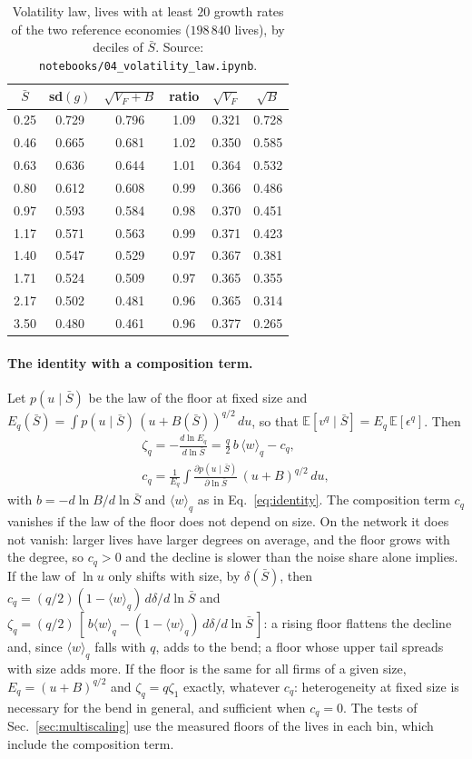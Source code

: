 \documentclass[pre,twocolumn,superscriptaddress,nofootinbib]{revtex4-2}
\newcommand{\E}{\mathbb E}
\newcommand{\Sb}{\bar S}
\begin{document}
\begin{table}[t]
\caption{Volatility law, lives with at least $20$ growth rates of the two reference economies
($198\,840$ lives), by deciles of $\Sb$.  Source: \texttt{notebooks/04\_volatility\_law.ipynb}.}
\label{tab:law}
\begin{ruledtabular}
\begin{tabular}{cccccc}
$\Sb$ & sd$(g)$ & $\sqrt{V_F+B}$ & ratio & $\sqrt{V_F}$ & $\sqrt B$\\
\hline
0.25 & 0.729 & 0.796 & 1.09 & 0.321 & 0.728\\
0.46 & 0.665 & 0.681 & 1.02 & 0.350 & 0.585\\
0.63 & 0.636 & 0.644 & 1.01 & 0.364 & 0.532\\
0.80 & 0.612 & 0.608 & 0.99 & 0.366 & 0.486\\
0.97 & 0.593 & 0.584 & 0.98 & 0.370 & 0.451\\
1.17 & 0.571 & 0.563 & 0.99 & 0.371 & 0.423\\
1.40 & 0.547 & 0.529 & 0.97 & 0.367 & 0.381\\
1.71 & 0.524 & 0.509 & 0.97 & 0.365 & 0.355\\
2.17 & 0.502 & 0.481 & 0.96 & 0.365 & 0.314\\
3.50 & 0.480 & 0.461 & 0.96 & 0.377 & 0.265\\
\end{tabular}
\end{ruledtabular}
\end{table}

\paragraph{The identity with a composition term.}  Let $p(u\mid\Sb)$ be the law of the floor at fixed
size and $E_q(\Sb)=\int p(u\mid\Sb)\,(u+B(\Sb))^{q/2}\,du$, so that $\E[v^q\mid\Sb]=E_q\,\E[\epsilon^q]$.  Then
\begin{gather}
\zeta_q=-\frac{d\ln E_q}{d\ln\Sb}=\frac q2\,b\,\langle w\rangle_q-c_q,\nonumber\\
c_q=\frac{1}{E_q}\int\frac{\partial p(u\mid\Sb)}{\partial\ln\Sb}\,(u+B)^{q/2}\,du ,
\label{eq:app-identity}
\end{gather}
with $b=-d\ln B/d\ln\Sb$ and $\langle w\rangle_q$ as in Eq.~\eqref{eq:identity}.  The composition term $c_q$ vanishes if the
law of the floor does not depend on size.  On the network it does not vanish: larger lives have
larger degrees on average, and the floor grows with the degree, so $c_q>0$ and the decline is slower
than the noise share alone implies.  If the law of $\ln u$ only shifts with size, by $\delta(\Sb)$, then
$c_q=(q/2)(1-\langle w\rangle_q)\,d\delta/d\ln\Sb$ and $\zeta_q=(q/2)\,[\,b\langle w\rangle_q-(1-\langle w\rangle_q)\,d\delta/d\ln\Sb\,]$: a
rising floor flattens the decline and, since $\langle w\rangle_q$ falls with $q$, adds to the bend; a floor whose upper
tail spreads with size adds more.  If the floor is the same for all firms of a given size, $E_q=(u+B)^{q/2}$
and $\zeta_q=q\zeta_1$ exactly, whatever $c_q$: heterogeneity at fixed size is necessary for the bend in
general, and sufficient when $c_q=0$.  The tests of Sec.~\ref{sec:multiscaling} use the measured floors of the lives in
each bin, which include the composition term.
\end{document}
